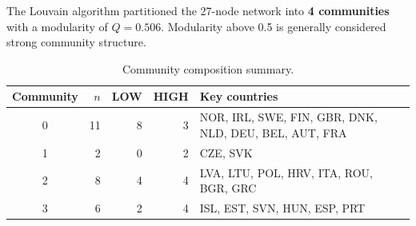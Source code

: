\documentclass[12pt,a4paper]{article}
\begin{document}
The Louvain algorithm partitioned the 27-node network into
\textbf{4 communities} with a modularity of $Q = 0.506$.
Modularity above 0.5 is generally considered strong community structure.

\begin{table}[h]
\centering
\caption{Community composition summary.}
\label{tab:comm_summary}
\begin{tabular}{@{}crrrl@{}}
\toprule
Community & $n$ & LOW & HIGH & Key countries \\
\midrule
0 & 11 & 8 & 3 & NOR, IRL, SWE, FIN, GBR, DNK, NLD, DEU, BEL, AUT, FRA \\
1 &  2 & 0 & 2 & CZE, SVK \\
2 &  8 & 4 & 4 & LVA, LTU, POL, HRV, ITA, ROU, BGR, GRC \\
3 &  6 & 2 & 4 & ISL, EST, SVN, HUN, ESP, PRT \\
\bottomrule
\end{tabular}
\end{table}
\end{document}
